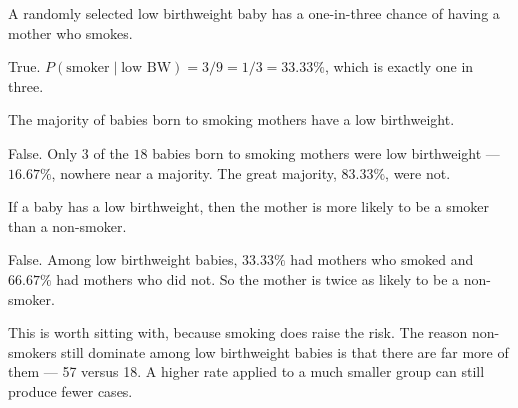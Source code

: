 \documentclass[12pt]{ximera}
\begin{document}
\begin{problem}
A randomly selected low birthweight baby has a one-in-three chance of having a mother who
smokes.
\begin{multipleChoice}
\end{multipleChoice}

\begin{freeResponse}
\end{freeResponse}

\begin{solution}
True. $P(\text{smoker} \mid \text{low BW}) = 3/9 = 1/3 = 33.33\%$, which is exactly one
in three.
\end{solution}
\end{problem}

\begin{problem}
The majority of babies born to smoking mothers have a low birthweight.
\begin{multipleChoice}
\end{multipleChoice}

\begin{freeResponse}
\end{freeResponse}

\begin{solution}
False. Only $3$ of the $18$ babies born to smoking mothers were low birthweight ---
$16.67\%$, nowhere near a majority. The great majority, $83.33\%$, were not.
\end{solution}
\end{problem}

\begin{problem}
If a baby has a low birthweight, then the mother is more likely to be a smoker than a
non-smoker.
\begin{multipleChoice}
\end{multipleChoice}

\begin{freeResponse}
\end{freeResponse}

\begin{solution}
False. Among low birthweight babies, $33.33\%$ had mothers who smoked and $66.67\%$ had
mothers who did not. So the mother is twice as likely to be a non-smoker.

This is worth sitting with, because smoking does raise the risk. The reason non-smokers
still dominate among low birthweight babies is that there are far more of them --- 57
versus 18. A higher rate applied to a much smaller group can still produce fewer cases.
\end{solution}
\end{problem}
\end{document}
